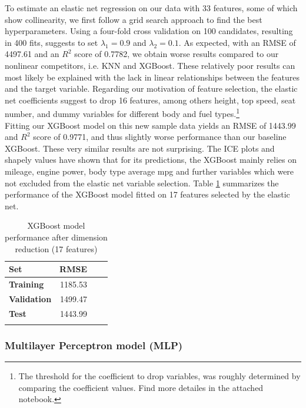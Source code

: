 \documentclass[12pt]{article}
\begin{document}
\noindent To estimate an elastic net regression on our data with 33 features, some of which show collinearity, we first follow a grid search approach to find the best hyperparameters. Using a four-fold cross validation on 100 candidates, resulting in 400 fits, suggests to set $\lambda_{1} = 0.9$ and $\lambda_{2} = 0.1$. As expected, with an RMSE of 4497.61 and an $R^2$ score of 0.7782, we obtain worse results compared to our nonlinear competitors, i.e. KNN and XGBoost. These relatively poor results can most likely be explained with the lack in linear relationships between the features and the target variable. Regarding our motivation of feature selection, the elastic net coefficients suggest to drop 16 features, among others  height, top speed, seat number, and dummy variables for different body and fuel types.\footnote{The threshold for the coefficient to drop variables, was roughly determined by comparing the coefficient values. Find more detailes in the attached notebook.}\\

\noindent Fitting our XGBoost model on this new sample data yields an RMSE of 1443.99 and $R^{2}$ score of 0.9771, and thus slightly worse performance than our baseline XGBoost. These very similar results are not surprising. The ICE plots and shapely values have shown that for its predictions, the XGBoost mainly relies on mileage, engine power, body type average mpg and further variables which were not excluded from the elastic net variable selection. Table \ref{xgboostelastic} summarizes the performance of the XGBoost model fitted on 17 features selected by the elastic net.

\begin{table}[h!]
    \centering
    \caption{XGBoost model performance after dimension reduction (17 features)}
    \begin{tabular}{>{\raggedright}p{5cm}rrr}
    \toprule
    \textbf{Set} & \textbf{RMSE} \\
    \midrule
    \textbf{Training} & 1185.53 \\     
    \textbf{Validation} & 1499.47 \\
    \textbf{Test} &  1443.99 \\
    \bottomrule
     \label{xgboostelastic}
    \end{tabular}
\end{table}


\subsubsection{Multilayer Perceptron model (MLP)}
\end{document}
